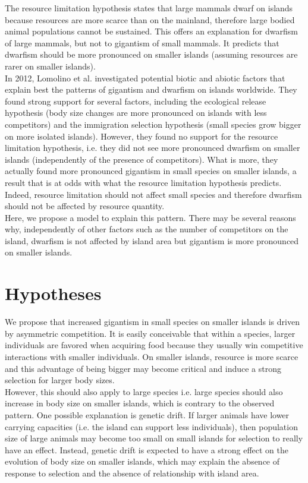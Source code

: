 \documentclass[12pt]{article}
\begin{document}
The resource limitation hypothesis states that large mammals dwarf on islands because resources are more scarce than on the mainland, therefore large bodied animal populations cannot be sustained. This offers an explanation for dwarfism of large mammals, but not to gigantism of small mammals. It predicts that dwarfism should be more pronounced on smaller islands (assuming resources are rarer on smaller islands).\\

In 2012, Lomolino et al. investigated potential biotic and abiotic factors that explain best the patterns of gigantism and dwarfism on islands worldwide. They found strong support for several factors, including the ecological release hypothesis (body size changes are more pronounced on islands with less competitors) and the immigration selection hypothesis (small species grow bigger on more isolated islands). However, they found no support for the resource limitation hypothesis, i.e. they did not see more pronounced dwarfism on smaller islands (independently of the presence of competitors). What is more, they actually found more pronounced gigantism in small species on smaller islands, a result that is at odds with what the resource limitation hypothesis predicts. Indeed, resource limitation should not affect small species and therefore dwarfism should not be affected by resource quantity.\\

Here, we propose a model to explain this pattern. There may be several reasons why, independently of other factors such as the number of competitors on the island, dwarfism is not affected by island area but gigantism is more pronounced on smaller islands.

\section{Hypotheses}

We propose that increased gigantism in small species on smaller islands is driven by asymmetric competition. It is easily conceivable that within a species, larger individuals are favored when acquiring food because they usually win competitive interactions with smaller individuals. On smaller islands, resource is more scarce and this advantage of being bigger may become critical and induce a strong selection for larger body sizes.\\

However, this should also apply to large species i.e. large species should also increase in body size on smaller islands, which is contrary to the observed pattern. One possible explanation is genetic drift. If larger animals have lower carrying capacities (i.e. the island can support less individuals), then population size of large animals may become too small on small islands for selection to really have an effect. Instead, genetic drift is expected to have a strong effect on the evolution of body size on smaller islands, which may explain the absence of response to selection and the absence of relationship with island area.\\
\end{document}
